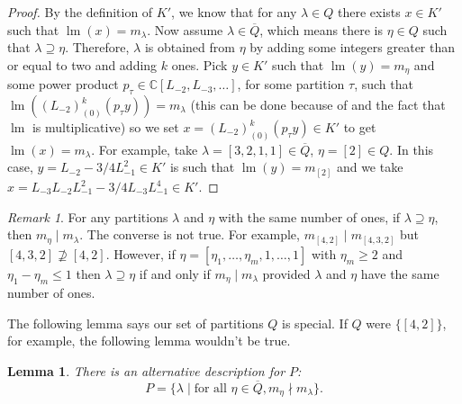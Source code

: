 \documentclass[12pt, reqno]{amsart}
\newtheorem{lemma}[theorem]{Lemma}
\theoremstyle{remark}
\newtheorem{remark}[theorem]{Remark}
\DeclareMathOperator{\lm}{lm}
\begin{document}
\begin{proof}
  By the definition of $K'$, we know that for any $\lambda \in Q$ there exists $x \in K'$ such that $\lm(x) = m_\lambda$.
  Now assume $\lambda \in \overline{Q}$, which means there is $\eta \in Q$ such that $\lambda \supseteq \eta$.
  Therefore, $\lambda$ is obtained from $\eta$ by adding some integers greater than or equal to two and adding $k$ ones.
  Pick $y \in K'$ such that $\lm(y) = m_\eta$ and some power product $p_\tau \in \mathbb{C}[L_{-2}, L_{-3}, \dots]$, for some partition $\tau$, such that $\lm((L_{-2})^k_{(0)}(p_\tau y)) = m_\lambda$ (this can be done because of  and the fact that $\lm$ is multiplicative) so we set $x = (L_{-2})^k_{(0)}(p_\tau y) \in K'$ to get $\lm(x) = m_\lambda$.
  For example, take $\lambda = [3, 2, 1, 1] \in \overline{Q}$, $\eta = [2] \in Q$.
  In this case, $y = L_{-2}- 3/4L_{-1}^2\in K'$ is such that $\lm(y) = m_{[2]}$ and we take $x = L_{-3}L_{-2}L_{-1}^2 - 3/4L_{-3}L_{-1}^4 \in K'$.
\end{proof}

\begin{remark}
  \label{rmk:7}
  For any partitions $\lambda$ and $\eta$ with the same number of ones, if $\lambda \supseteq \eta$, then $m_\eta \mid m_\lambda$.
  The converse is not true.
  For example, $m_{[4, 2]} \mid m_{[4, 3, 2]}$ but $[4, 3, 2] \nsupseteq [4, 2]$.
  However, if $\eta = [\eta_1, \dots, \eta_m, 1, \dots, 1]$ with $\eta_m \ge 2$ and $\eta_1 - \eta_m \le 1$ then $\lambda \supseteq \eta$ if and only if $m_\eta \mid m_\lambda$ provided $\lambda$ and $\eta$ have the same number of ones.
\end{remark}

The following lemma says our set of partitions $Q$ is special.
If $Q$ were $\{[4, 2]\}$, for example, the following lemma wouldn't be true.

\begin{lemma}
  \label{lmm:11}
  There is an alternative description for $P$:
  \begin{equation*}
    P = \{\lambda \mid \text{for all }\eta \in \overline{Q}, m_\eta \nmid m_\lambda\}.
  \end{equation*}
\end{lemma}
\end{document}
